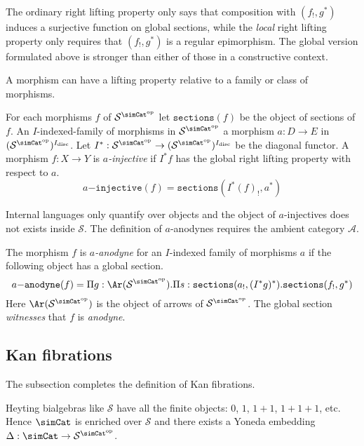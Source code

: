 \documentclass{tac}
\newcommand\hide[1]{}
\newcommand\cat\mathcal
\newcommand\ri{^*}
\newcommand\dual{^{\mathrm{op}}}
\newcommand\disc{_{\mathrm{disc}}}
\newcommand\s{^{\simCat\dual}}
\newcommand\bang{!}
\newcommand\of{:}
\newcommand\code\mathtt
\begin{document}
The ordinary right lifting property only says that composition with $(f_!,g\ri)$ induces a surjective function on global sections, while the \emph{local} right lifting property only requires that $(f_!,g\ri)$ is a regular epimorphism. The global version formulated above is stronger than either of those in a constructive context.

A morphism can have a lifting property relative to a family or class of morphisms.

\begin{definition}[Injective] For each morphisms $f$ of $\cat S\s$ let $\code{sections}(f)$ be the object of sections of $f$. An $I$-indexed-family of morphisms in $\cat S\s$ a morphism $a\of D\to E$ in $(\cat S\s)^{I\disc}$. Let $I\ri\of\cat S\s\to (\cat S\s)^{I\disc}$ be the diagonal functor. A morphism $f\of X\to Y$ is \emph{$a$-injective} if $I\ri f$ has the global right lifting property with respect to $a$.
\[ a\code{-injective}(f)=\code{sections}(I\ri(f)_\bang,a\ri) \]
\end{definition}

\hide{Add?: These injectives satisfy the usual properties of closure under products, composition and pullback, thanks to specific constructions on filler operators.}

Internal languages only quantify over objects and the object of $a$-injectives does not exists inside $\cat S$. The definition of $a$-anodynes requires the ambient category $\cat A$.

\begin{definition}
The morphism $f$ is \emph{$a$-anodyne} for an $I$-indexed family of morphisms $a$ if the following object has a global section.
\[ a\code{-anodyne}(f) = \Pi g\of \Ar(\cat S\s).\Pi s\of \code{sections}(a_!,(I\ri g)\ri).\code{sections}(f_!,g\ri) \]
Here $\Ar(\cat S\s)$ is the object of arrows of $\cat S\s$. The global section \emph{witnesses} that $f$ is \emph{anodyne}. 
\end{definition}


\subsection{Kan fibrations}
The subsection completes the definition of Kan fibrations.

Heyting bialgebras like $\cat S$ have all the finite objects: $0$, $1$, $1+1$, $1+1+1$, etc. Hence $\simCat$ is enriched over $\cat S$ and there exists a Yoneda embedding $\Delta\of \simCat \to \cat S^{\simCat \dual}$. 
\end{document}
